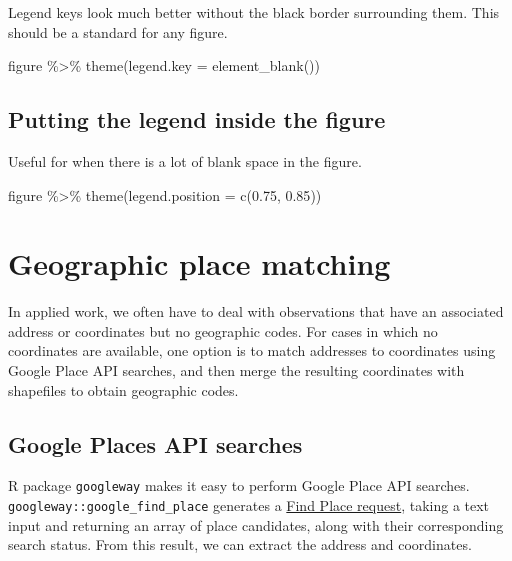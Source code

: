 \documentclass[
]{book}
\newenvironment{Shaded}{\begin{snugshade}}{\end{snugshade}}
\newcommand{\AttributeTok}[1]{\textcolor[rgb]{0.77,0.63,0.00}{#1}}
\newcommand{\FloatTok}[1]{\textcolor[rgb]{0.00,0.00,0.81}{#1}}
\newcommand{\FunctionTok}[1]{\textcolor[rgb]{0.00,0.00,0.00}{#1}}
\newcommand{\NormalTok}[1]{#1}
\newcommand{\SpecialCharTok}[1]{\textcolor[rgb]{0.00,0.00,0.00}{#1}}
\begin{document}
Legend keys look much better without the black border surrounding them. This should be a standard for any figure.

\begin{Shaded}
\begin{Highlighting}[]
\NormalTok{figure }\SpecialCharTok{\%\textgreater{}\%} 
  \FunctionTok{theme}\NormalTok{(}\AttributeTok{legend.key =} \FunctionTok{element\_blank}\NormalTok{())}
\end{Highlighting}
\end{Shaded}

\hypertarget{putting-the-legend-inside-the-figure}{%
\subsection{Putting the legend inside the figure}\label{putting-the-legend-inside-the-figure}}

Useful for when there is a lot of blank space in the figure.

\begin{Shaded}
\begin{Highlighting}[]
\NormalTok{figure }\SpecialCharTok{\%\textgreater{}\%} 
  \FunctionTok{theme}\NormalTok{(}\AttributeTok{legend.position =} \FunctionTok{c}\NormalTok{(}\FloatTok{0.75}\NormalTok{, }\FloatTok{0.85}\NormalTok{))}
\end{Highlighting}
\end{Shaded}

\hypertarget{geographic-place-matching}{%
\section{Geographic place matching}\label{geographic-place-matching}}

In applied work, we often have to deal with observations that have an associated address or coordinates but no geographic codes. For cases in which no coordinates are available, one option is to match addresses to coordinates using Google Place API searches, and then merge the resulting coordinates with shapefiles to obtain geographic codes.

\hypertarget{google-places-api-searches}{%
\subsection{Google Places API searches}\label{google-places-api-searches}}

R package \texttt{googleway} makes it easy to perform Google Place API searches. \texttt{googleway::google\_find\_place} generates a \href{https://developers.google.com/maps/documentation/places/web-service/search-find-place}{Find Place request}, taking a text input and returning an array of place candidates, along with their corresponding search status. From this result, we can extract the address and coordinates.
\end{document}
